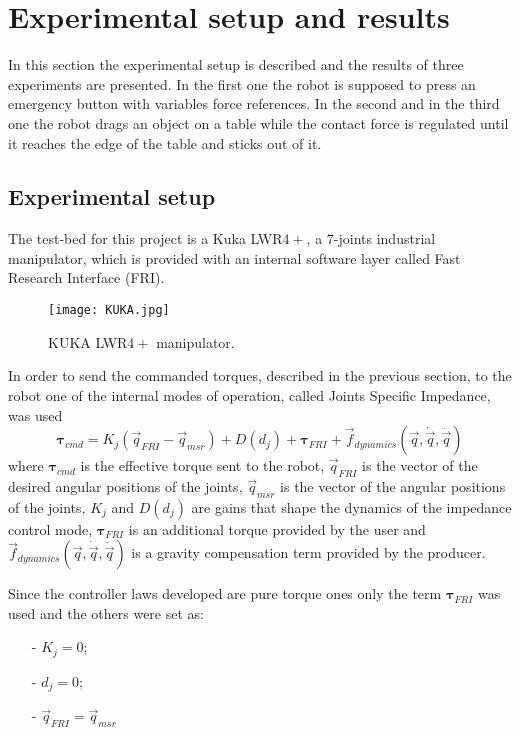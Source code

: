 \section{Experimental setup and results}
In this section the experimental setup is described and the 
results of three experiments are presented.
In the first one the robot is supposed to press an emergency button with variables
force references. In the second and in the third one the robot drags an object on a table 
while the contact force is regulated until 
it reaches the edge of the table and sticks out of it.

\subsection{Experimental setup}
The test-bed for this project is a Kuka LWR$4+$, a $7$-joints industrial manipulator, 
which is provided with an internal software layer called Fast Research Interface (FRI).
\begin{figure}[h]
  \centering
  \texttt{[image: KUKA.jpg]}
  \caption{KUKA LWR$4+$ manipulator. \label{fig:kuka_lwr}}
\end{figure}
\par
In order to send the commanded torques, described in the previous section, to the robot
 one of the internal modes of operation, called Joints Specific Impedance, was used
\[
\boldsymbol{\tau}_{cmd} = K_j(\vec{q}_{FRI} - \vec{q}_{msr}) + D(d_{j}) + \boldsymbol{\tau}_{FRI} + \vec{f}_{dynamics}(\vec{q}, \dot{\vec{q}}, \ddot{\vec{q}})
\]
where $\boldsymbol{\tau}_{cmd}$ is the effective torque sent to the robot, 
$\vec{q}_{FRI}$ is the vector of the desired angular positions of the joints, 
$\vec{q}_{msr}$ is the vector of the angular positions of the joints, 
$K_j$ and $D(d_j)$ are gains that shape the dynamics of the impedance control mode,
$\boldsymbol{\tau}_{FRI}$ is an additional torque provided by the user and 
$\vec{f}_{dynamics}(\vec{q}, \dot{\vec{q}}, \ddot{\vec{q}})$ is a gravity compensation
term provided by the producer.
\par
Since the controller laws developed are pure torque ones only the term
$\boldsymbol{\tau}_{FRI}$ was used and the others were set as:
\begin{itemize}
\item[-] $K_j = 0$;
\item[-] $d_j = 0$;
\item[-] $\vec{q}_{FRI} = \vec{q}_{msr}$
\end{itemize}

